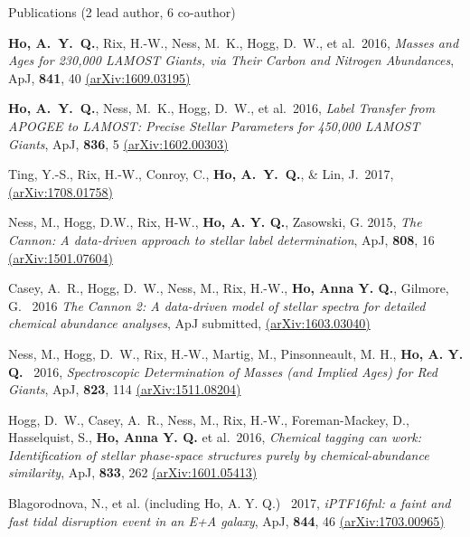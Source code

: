 \documentclass{resume} %
\begin{document}

\begin{rSection}{Publications (2 lead author, 6 co-author)}

\textbf{Ho, A.~Y.~Q.}, Rix, H.-W., Ness, M.~K., Hogg, D.~W., et al.\ 2016, 
\emph{Masses and Ages for 230,000 LAMOST Giants,
via Their Carbon and Nitrogen Abundances},
ApJ, \textbf{841}, 40
\href{http://arxiv.org/abs/1609.03195}{(arXiv:1609.03195)}

\textbf{Ho, A.~Y.~Q.}, Ness, M.~K., Hogg, D.~W., et al.\ 2016, 
\emph{Label Transfer from APOGEE to LAMOST: Precise Stellar Parameters for 
450,000 LAMOST Giants}, ApJ,
\textbf{836}, 5
\href{http://arxiv.org/abs/1602.00303}{(arXiv:1602.00303)}

Ting, Y.-S., Rix, H.-W., Conroy, C., \textbf{Ho, A.~Y.~Q.}, \& Lin, J.\ 2017, \href{https://arxiv.org/abs/1708.01758}{(arXiv:1708.01758)}


Ness, M., Hogg, D.W., Rix, H-W., \textbf{Ho, A. Y. Q.}, Zasowski, G. 2015,
\emph{The Cannon: A data-driven approach to stellar label determination}, ApJ,
\textbf{808}, 16 \href{http://arxiv.org/abs/1501.07604}{(arXiv:1501.07604)}

Casey, A.~R., Hogg, D.~W., Ness, M., Rix, H.-W., 
\textbf{Ho, Anna Y. Q.}, Gilmore, G. \ 2016
\emph{The Cannon 2: 
A data-driven model of stellar spectra for detailed 
chemical abundance analyses},
ApJ submitted,
\href{http://arxiv.org/abs/1603.03040}{(arXiv:1603.03040)}

Ness, M., Hogg, D.~W., Rix, H.-W., Martig, M., Pinsonneault, M. H.,
\textbf{Ho, A. Y. Q.} \ 2016, 
\emph{Spectroscopic Determination of Masses (and Implied Ages) for Red Giants},
ApJ, \textbf{823}, 114 \href{http://arxiv.org/abs/1511.08204}
{(arXiv:1511.08204)}

Hogg, D.~W., Casey, A.~R., Ness, M., Rix, H.-W., Foreman-Mackey, D., 
Hasselquist, S., \textbf{Ho, Anna Y. Q.} et al.\ 2016,
\emph{Chemical tagging can work: Identification of stellar 
phase-space structures purely by chemical-abundance similarity},
ApJ, \textbf{833}, 262
\href{http://arxiv.org/abs/1601.05413}{(arXiv:1601.05413)}

Blagorodnova, N., et al. (including {Ho, A. Y. Q.}) \ 2017,
\emph{iPTF16fnl: a faint and fast tidal disruption event in an E+A galaxy},
ApJ, \textbf{844}, 46
\href{https://arxiv.org/abs/1703.00965}{(arXiv:1703.00965)}

\end{rSection}

\end{document}
